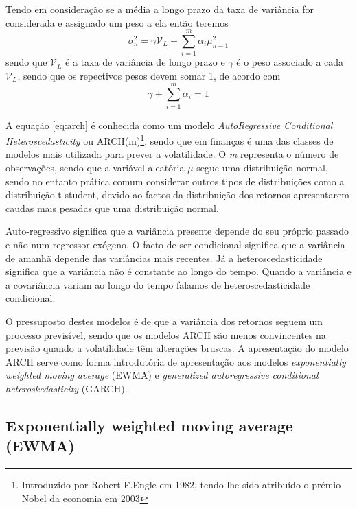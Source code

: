 \documentclass[
  12pt,
  a4paper,
  openany]{book}
\begin{document}
Tendo em consideração \citet{Hull2018} se a média a longo prazo da taxa de variância for considerada e assignado um peso a ela então teremos
\begin{equation} 
  \sigma_{n}^{2} =\gamma\mathcal{V}_{L}+\sum_{i=1}^{m}\alpha_i\mu_{n-1}^{2}
  \label{eq:arch}
\end{equation}
sendo que \(\mathcal{V}_{L}\) é a taxa de variância de longo prazo e \(\gamma\) é o peso associado a cada \(\mathcal{V}_{L}\), sendo que os repectivos pesos devem somar 1, de acordo com \[\gamma + \sum_{i=1}^{m}\alpha_i = 1\]

A equação \eqref{eq:arch} é conhecida como um modelo \emph{AutoRegressive Conditional Heteroscedasticity} ou ARCH(m)\footnote{Introduzido por Robert F.Engle em 1982, tendo-lhe sido atribuído o prémio Nobel da economia em 2003}, sendo que em finanças é uma das classes de modelos mais utilizada para prever a volatilidade. O \emph{m} representa o número de observações, sendo que a variável aleatória \(\mu\) segue uma distribuição normal, sendo no entanto prática comum considerar outros tipos de distribuições como a distribuição t-student, devido ao factos da distribuição dos retornos apresentarem caudas mais pesadas que uma distribuição normal.

Auto-regressivo significa que a variância presente depende do seu próprio passado e não num regressor exógeno. O facto de ser condicional significa que a variância de amanhã depende das variâncias mais recentes. Já a heteroscedasticidade significa que a variância não é constante ao longo do tempo. Quando a variância e a covariância variam ao longo do tempo falamos de heteroscedasticidade condicional.

O pressuposto destes modelos é de que a variância dos retornos seguem um processo previsível, sendo que os modelos ARCH são menos convincentes na previsão quando a volatilidade têm alterações bruscas. A apresentação do modelo ARCH serve como forma introdutória de apresentação aos modelos \emph{exponentially weighted moving average} (EWMA) e \emph{generalized autoregressive conditional heteroskedasticity} (GARCH).

\hypertarget{exponentially-weighted-moving-average-ewma}{%
\subsection{Exponentially weighted moving average (EWMA)}\label{exponentially-weighted-moving-average-ewma}}
\end{document}
